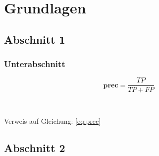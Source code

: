 \chapter{Grundlagen}
\label{ch:theorie}

\section{Abschnitt 1}
\label{sec:IR}


\subsection{Unterabschnitt}
\label{sec:PuR}
\begin{equation}
\label{eq:prec}
\textbf{prec} = \frac{TP}{TP + FP}
\end{equation}

 \\ \par
Verweis auf Gleichung: \ref{eq:prec} \par
{}


\section{Abschnitt 2}





	




